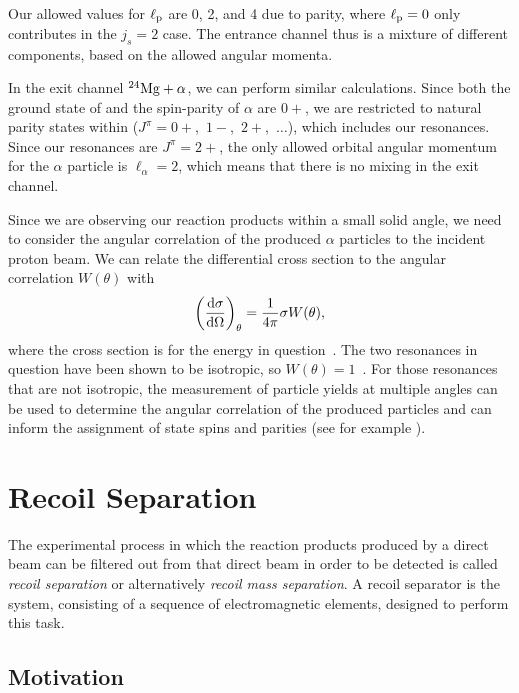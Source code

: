 Our allowed values for $\ell_{\rm{p}}$ are 0, 2, and 4 due to parity,
where $\ell_{\rm{p}} = 0$ only contributes in the $j_s = 2$ case. The
entrance channel thus is a mixture of different components, based on the
allowed angular momenta.

In the exit channel ${}^{24}\textrm{Mg} + \alpha$, we can perform similar
calculations. Since both the ground state of  and the
spin-parity of $\alpha$ are $0+$, we are restricted to natural parity
states within  ($J^{\pi} = 0+$,~$1-$,~$2+$,~$\ldots$), which
includes our resonances. Since our resonances are $J^{\pi} = 2+$, the
only allowed orbital angular momentum for the $\alpha$ particle is
$\ell_{\alpha} = 2$, which means that there is no mixing in the exit
channel.

Since we are observing our reaction products within a small solid angle,
we need to consider the angular correlation of the produced $\alpha$
particles to the incident proton beam. We can relate the differential
cross section to the angular correlation $W(\theta)$ with
\[
    \left(\frac{\rm{d}\sigma}{\rm{d}\Omega}\right)_{\theta} =
        \frac{1}{4\pi}\sigma W(\theta),
\]
where the cross section is for the energy in question~\cite{Iliadis}.
The two resonances in question have been shown to be isotropic, so
$W(\theta) = 1$~\cite{Andersen1961}. For those resonances that are not
isotropic, the measurement of particle yields at multiple angles can be
used to determine the angular correlation of the produced particles and
can inform the assignment of state spins and parities (see for example
\cite{deBoer2015}).



\section{Recoil Separation}
\label{sec:ch01-recoil-separation}

The experimental process in which the reaction products produced by a
direct beam can be filtered out from that direct beam in order to be
detected is called \emph{recoil separation} or alternatively
\emph{recoil mass separation}. A recoil separator is the system,
consisting of a sequence of electromagnetic elements, designed to
perform this task.

\subsection{Motivation}
\label{ssec:recoil-separation-motivation}

